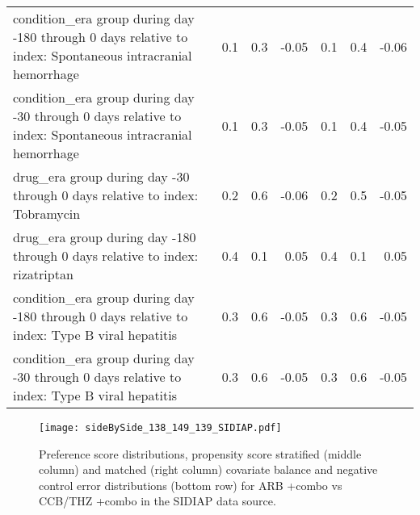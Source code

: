 \documentclass[11pt,]{article}
\begin{document}
\begin{longtable}{p{30em}rrrrrr}
  condition\_era group during day -180 through 0 days relative to index: Spontaneous intracranial hemorrhage & 0.1 & 0.3 & -0.05 & 0.1 & 0.4 & -0.06 \\ 
  condition\_era group during day -30 through 0 days relative to index: Spontaneous intracranial hemorrhage & 0.1 & 0.3 & -0.05 & 0.1 & 0.4 & -0.05 \\ 
  drug\_era group during day -30 through 0 days relative to index: Tobramycin & 0.2 & 0.6 & -0.06 & 0.2 & 0.5 & -0.05 \\ 
  drug\_era group during day -180 through 0 days relative to index: rizatriptan & 0.4 & 0.1 & 0.05 & 0.4 & 0.1 & 0.05 \\ 
  condition\_era group during day -180 through 0 days relative to index: Type B viral hepatitis & 0.3 & 0.6 & -0.05 & 0.3 & 0.6 & -0.05 \\ 
  condition\_era group during day -30 through 0 days relative to index: Type B viral hepatitis & 0.3 & 0.6 & -0.05 & 0.3 & 0.6 & -0.05 \\ 
  \bottomrule
\end{longtable}
\clearpage\begin{figure}[H]
    \caption{Preference score distributions,
    propensity score stratified (middle column) and matched (right column) covariate balance
    and negative control error distributions (bottom row) for
    ARB +combo vs CCB/THZ +combo in the SIDIAP data source.}
    \centerline{
        \texttt{[image: sideBySide\_138\_149\_139\_SIDIAP.pdf]}
    }
\end{figure}
\end{document}
